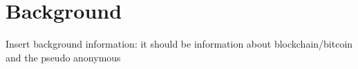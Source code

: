 \section{Background}
Insert background information: it should be information about blockchain/bitcoin
and the pseudo anonymous